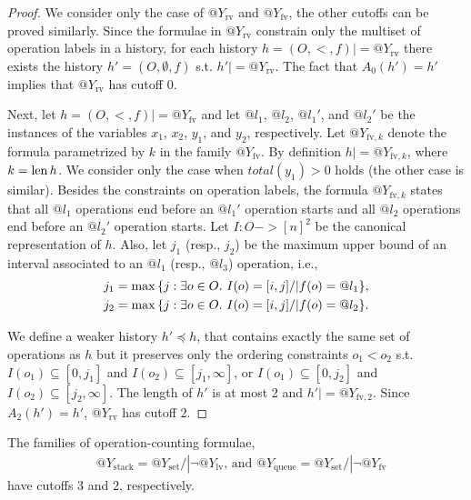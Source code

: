 \begin{proof}%

  We consider only the case of $@Y_\mathrm{rv}$ and $@Y_\mathrm{fv}$, the other
  cutoffs can be proved similarly.
  Since the formulae in $@Y_\mathrm{rv}$ constrain only the multiset of operation
  labels in a history, for each history $h=(O,<,f) |= @Y_\mathrm{rv}$ there
  exists the history $h'=(O,\emptyset,f)$ s.t. $h' |= @Y_\mathrm{rv}$. The
  fact that $A_0(h')=h'$ implies that $@Y_\mathrm{rv}$ has cutoff $0$.
 
  Next, let $h=(O,<,f) |= @Y_\mathrm{fv}$ and let $@l_1$, $@l_2$, $@l_1'$, and
  $@l_2'$ be the instances of the variables $x_1$, $x_2$, $y_1$, and $y_2$,
  respectively. Let $@Y_{\mathrm{fv},k}$ denote the formula parametrized by $k$ in the family $@Y_\mathrm{fv}$.
  By definition $h |=  @Y_{\mathrm{fv},k}$, where $k=\operatorname{len} h$.
  We consider only the case when $total(y_1)>0$ holds (the other
  case is similar). Besides the constraints on operation labels, the formula $@Y_{\mathrm{fv},k}$ 
  states that all $@l_1$ operations end before an $@l_1'$
  operation starts and all $@l_2$ operations end before an $@l_2'$ operation
  starts. Let $I:O->[n]^2$ be the canonical representation of $h$. Also, let
  $j_1$ (resp., $j_2$) be the maximum upper bound of an interval associated to
  an $@l_1$ (resp., $@l_3$) operation, i.e.,
  \begin{align*}
    j_1 = \max{\{ j:\exists o\in O.\ I(o) = [i,j] /| f(o)=@l_1 \}},\\
    j_2 = \max{\{ j:\exists o\in O.\ I(o) = [i,j] /| f(o)=@l_2 \}}.
  \end{align*}
 
  We define a weaker history $h'\preceq h$, that contains exactly the same set
  of operations as $h$ but it preserves only the ordering constraints $o_1<o_2$ s.t. 
  $I(o_1)\subseteq [0,j_1]$ and $I(o_2)\subseteq [j_1,\infty]$, or
  $I(o_1)\subseteq [0,j_2]$ and $I(o_2)\subseteq [j_2,\infty]$. The
  length of $h'$ is at most 2
  and $h'|= @Y_{\mathrm{fv},2}$. Since $A_2(h')=h'$, 
  $@Y_\mathrm{rv}$ has cutoff $2$.
\end{proof}

\begin{corollary}

  The families of operation-counting formulae,
  \begin{align*}
    & @Y_\mathrm{stack} = @Y_\mathrm{set} /| \lnot @Y_\mathrm{lv}
    \text{, and }
    @Y_\mathrm{queue} = @Y_\mathrm{set} /| \lnot @Y_\mathrm{fv}
  \end{align*}
  have cutoffs $3$ and $2$, respectively.

\end{corollary}

